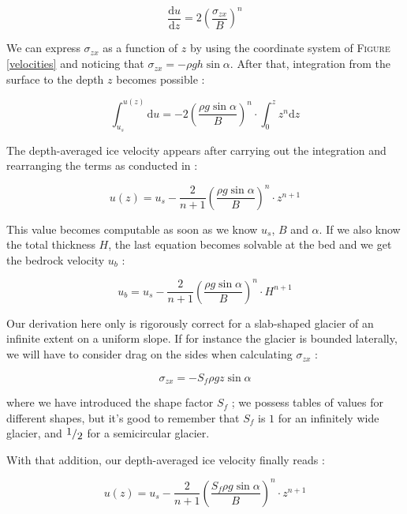 \begin{equation}\frac{\mathrm{d} u}{\mathrm{d} z} = 2 \left( \frac{\sigma_{zx}}{B}\right)^n\end{equation}

We can express $\sigma_{zx}$ as a function of $z$ by using the coordinate system of \textsc{Figure} \ref{velocities} and noticing that $\sigma_{zx} = -\rho g h \sin{\alpha}$. After that, integration from the surface to the depth $z$ becomes possible :

\begin{equation}\int_{u_s}^{u(z)} \mathrm{d} u = -2 \left( \frac{\rho g \sin{\alpha}}{B}\right)^n \cdot \int_{0}^{z} z^n \mathrm{d} z\end{equation}


The depth-averaged ice velocity appears after carrying out the integration and rearranging the terms as conducted in \cite{Hooke2005} :

\begin{equation}u(z) = u_s - \frac{2}{n + 1} \left( \frac{\rho g \sin{\alpha}}{B}\right)^n \cdot z^{n+1}\end{equation}

This value becomes computable as soon as we know $u_s$, $B$ and $\alpha$. If we also know the total thickness $H$, the last equation becomes solvable at the bed and we get the bedrock velocity $u_b$ :

\begin{equation}u_b = u_s - \frac{2}{n + 1} \left( \frac{\rho g \sin{\alpha}}{B}\right)^n \cdot H^{n+1}\end{equation}

Our derivation here only is rigorously correct for a slab-shaped glacier of an infinite extent on a uniform slope. If for instance the glacier is bounded laterally, we will have to consider drag on the sides when calculating $\sigma_{zx}$ :

\begin{equation}\sigma_{zx} = -S_f \rho g z \sin{\alpha}\end{equation}

where we have introduced the shape factor $S_f$ ; we possess tables of values for different shapes, but it's good to remember that $S_f$ is $1$ for an infinitely wide glacier, and $\fraction{1}{2}$ for a semicircular glacier.

With that addition, our depth-averaged ice velocity finally reads :

\begin{equation}
\boxed{u(z) = u_s - \frac{2}{n + 1} \left( \frac{S_f \rho g \sin{\alpha}}{B}\right)^n \cdot z^{n+1}}
\end{equation}


